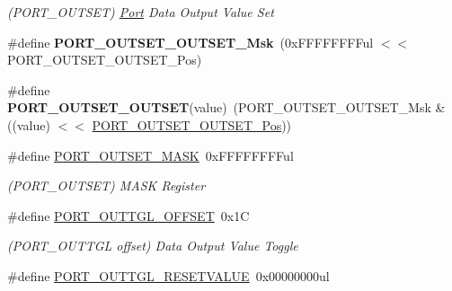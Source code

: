 \begin{DoxyCompactItemize}
\begin{DoxyCompactList}\small\item\em (P\+O\+R\+T\+\_\+\+O\+U\+T\+S\+E\+T) \hyperlink{struct_port}{Port} Data Output Value Set \end{DoxyCompactList}\item 
\hypertarget{group___s_a_m_l21___p_o_r_t_ga090fd7414eb6fa473a4036f84f853dca}{}\#define {\bfseries P\+O\+R\+T\+\_\+\+O\+U\+T\+S\+E\+T\+\_\+\+O\+U\+T\+S\+E\+T\+\_\+\+Msk}~(0x\+F\+F\+F\+F\+F\+F\+F\+Ful $<$$<$ P\+O\+R\+T\+\_\+\+O\+U\+T\+S\+E\+T\+\_\+\+O\+U\+T\+S\+E\+T\+\_\+\+Pos)\label{group___s_a_m_l21___p_o_r_t_ga090fd7414eb6fa473a4036f84f853dca}

\item 
\hypertarget{group___s_a_m_l21___p_o_r_t_gad55b0fcb6f9df9920cdd1e23cb809b31}{}\#define {\bfseries P\+O\+R\+T\+\_\+\+O\+U\+T\+S\+E\+T\+\_\+\+O\+U\+T\+S\+E\+T}(value)~(P\+O\+R\+T\+\_\+\+O\+U\+T\+S\+E\+T\+\_\+\+O\+U\+T\+S\+E\+T\+\_\+\+Msk \& ((value) $<$$<$ \hyperlink{group___s_a_m_l21___p_o_r_t_gab15b9d26363709ae77584b0f8140ba42}{P\+O\+R\+T\+\_\+\+O\+U\+T\+S\+E\+T\+\_\+\+O\+U\+T\+S\+E\+T\+\_\+\+Pos}))\label{group___s_a_m_l21___p_o_r_t_gad55b0fcb6f9df9920cdd1e23cb809b31}

\item 
\hypertarget{group___s_a_m_l21___p_o_r_t_gac9419f71279d6ec7826fd713af780d7c}{}\#define \hyperlink{group___s_a_m_l21___p_o_r_t_gac9419f71279d6ec7826fd713af780d7c}{P\+O\+R\+T\+\_\+\+O\+U\+T\+S\+E\+T\+\_\+\+M\+A\+S\+K}~0x\+F\+F\+F\+F\+F\+F\+F\+Ful\label{group___s_a_m_l21___p_o_r_t_gac9419f71279d6ec7826fd713af780d7c}

\begin{DoxyCompactList}\small\item\em (P\+O\+R\+T\+\_\+\+O\+U\+T\+S\+E\+T) M\+A\+S\+K Register \end{DoxyCompactList}\item 
\hypertarget{group___s_a_m_l21___p_o_r_t_ga661859dca022c7deb7a367616d203747}{}\#define \hyperlink{group___s_a_m_l21___p_o_r_t_ga661859dca022c7deb7a367616d203747}{P\+O\+R\+T\+\_\+\+O\+U\+T\+T\+G\+L\+\_\+\+O\+F\+F\+S\+E\+T}~0x1\+C\label{group___s_a_m_l21___p_o_r_t_ga661859dca022c7deb7a367616d203747}

\begin{DoxyCompactList}\small\item\em (P\+O\+R\+T\+\_\+\+O\+U\+T\+T\+G\+L offset) Data Output Value Toggle \end{DoxyCompactList}\item 
\hypertarget{group___s_a_m_l21___p_o_r_t_ga487997310b5fc1ce56e003c201da8df2}{}\#define \hyperlink{group___s_a_m_l21___p_o_r_t_ga487997310b5fc1ce56e003c201da8df2}{P\+O\+R\+T\+\_\+\+O\+U\+T\+T\+G\+L\+\_\+\+R\+E\+S\+E\+T\+V\+A\+L\+U\+E}~0x00000000ul\label{group___s_a_m_l21___p_o_r_t_ga487997310b5fc1ce56e003c201da8df2}


\end{DoxyCompactItemize}
